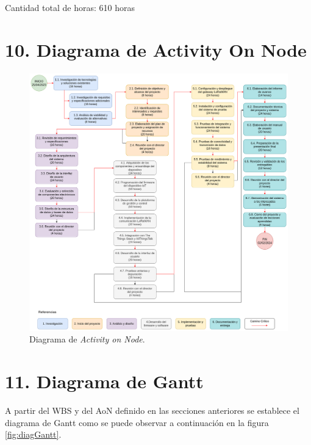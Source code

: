 \documentclass[
11pt, %
]{charter}
\begin{document}
Cantidad total de horas: 610 horas


\vspace*{\fill}
\pagebreak
\section{10. Diagrama de Activity On Node}
\label{sec:AoN}

\begin{figure}[htpb]
\centering 
\includegraphics[width=1.1\textwidth]{./Figuras/AoN.png}
\caption{Diagrama de \textit{Activity on Node}.}
\label{fig:AoN}
\end{figure}



\section{11. Diagrama de Gantt}
\label{sec:diagGantt}

A partir del WBS y del AoN definido en las secciones anteriores se establece el diagrama de Gantt como se puede observar a continuación en la figura \ref{fig:diagGantt}.
\end{document}
